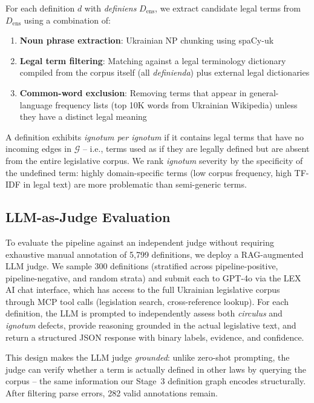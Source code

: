\documentclass[11pt]{article}
\begin{document}
For each definition $d$ with \emph{definiens} $D_{\text{ens}}$, we extract candidate legal terms from $D_{\text{ens}}$ using a combination of:
\begin{enumerate}[nosep,leftmargin=*]
  \item \textbf{Noun phrase extraction}: Ukrainian NP chunking using spaCy-uk
  \item \textbf{Legal term filtering}: Matching against a legal terminology dictionary compiled from the corpus itself (all \emph{definienda}) plus external legal dictionaries
  \item \textbf{Common-word exclusion}: Removing terms that appear in general-language frequency lists (top 10K words from Ukrainian Wikipedia) unless they have a distinct legal meaning
\end{enumerate}

A definition exhibits \emph{ignotum per ignotum} if it contains legal terms that have no incoming edges in $\mathcal{G}$ -- i.e., terms used as if they are legally defined but are absent from the entire legislative corpus.
We rank \emph{ignotum} severity by the specificity of the undefined term: highly domain-specific terms (low corpus frequency, high TF-IDF in legal text) are more problematic than semi-generic terms.

\subsection{LLM-as-Judge Evaluation}
\label{sec:llm-baseline}

To evaluate the pipeline against an independent judge without requiring exhaustive manual annotation of 5{,}799 definitions, we deploy a RAG-augmented LLM judge.
We sample 300 definitions (stratified across pipeline-positive, pipeline-negative, and random strata) and submit each to GPT-4o via the LEX AI chat interface, which has access to the full Ukrainian legislative corpus through MCP tool calls (legislation search, cross-reference lookup).
For each definition, the LLM is prompted to independently assess both \emph{circulus} and \emph{ignotum} defects, provide reasoning grounded in the actual legislative text, and return a structured JSON response with binary labels, evidence, and confidence.

This design makes the LLM judge \emph{grounded}: unlike zero-shot prompting, the judge can verify whether a term is actually defined in other laws by querying the corpus -- the same information our Stage~3 definition graph encodes structurally.
After filtering parse errors, 282 valid annotations remain.
\end{document}
